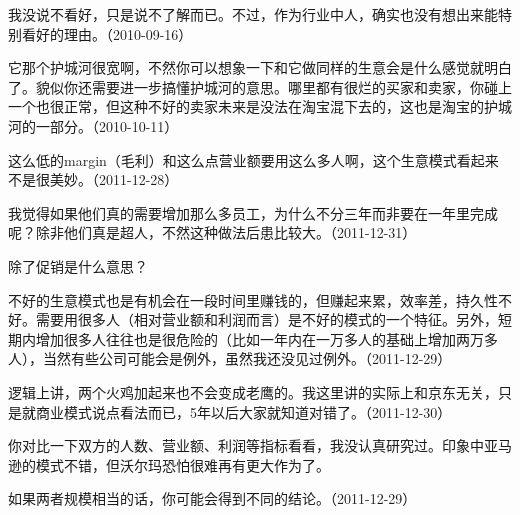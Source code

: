 我没说不看好，只是说不了解而已。不过，作为行业中人，确实也没有想出来能特别看好的理由。（2010-09-16）


它那个护城河很宽啊，不然你可以想象一下和它做同样的生意会是什么感觉就明白了。貌似你还需要进一步搞懂护城河的意思。哪里都有很烂的买家和卖家，你碰上一个也很正常，但这种不好的卖家未来是没法在淘宝混下去的，这也是淘宝的护城河的一部分。（2010-10-11）


这么低的margin（毛利）和这么点营业额要用这么多人啊，这个生意模式看起来不是很美妙。（2011-12-28）

我觉得如果他们真的需要增加那么多员工，为什么不分三年而非要在一年里完成呢？除非他们真是超人，不然这种做法后患比较大。（2011-12-31）


除了促销是什么意思？


不好的生意模式也是有机会在一段时间里赚钱的，但赚起来累，效率差，持久性不好。需要用很多人（相对营业额和利润而言）是不好的模式的一个特征。另外，短期内增加很多人往往也是很危险的（比如一年内在一万多人的基础上增加两万多人），当然有些公司可能会是例外，虽然我还没见过例外。（2011-12-29）


逻辑上讲，两个火鸡加起来也不会变成老鹰的。我这里讲的实际上和京东无关，只是就商业模式说点看法而已，5年以后大家就知道对错了。（2011-12-30）


你对比一下双方的人数、营业额、利润等指标看看，我没认真研究过。印象中亚马逊的模式不错，但沃尔玛恐怕很难再有更大作为了。


如果两者规模相当的话，你可能会得到不同的结论。（2011-12-29）

